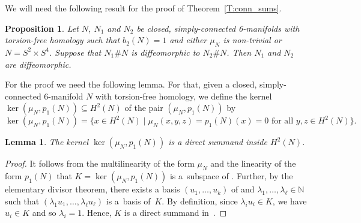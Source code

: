 \documentclass[10pt,a4paper]{amsart}
\numberwithin{equation}{section}
\newtheorem{Lemma}[Theorem]{Lemma}
\newtheorem{Proposition}[Theorem]{Proposition}
\theoremstyle{definition}
\numberwithin{table}{section}
\newcommand{\N}{\mathbb{N}}
\begin{document}
We will need the following result for the proof of Theorem~\ref{T:conn_sums}.
\begin{Proposition}\label{P:splitting_diffeo}
	Let $N$, $N_1$ and $N_2$ be closed, simply-connected 6-manifolds with torsion-free homology such that $b_2(N)=1$ and either $\mu_N$ is non-trivial or $N=S^2\times S^4$. Suppose that $N_1\# N$ is diffeomorphic to $N_2\# N$. Then $N_1$ and $N_2$ are diffeomorphic.
\end{Proposition}
For the proof we need the following lemma. For that, given a closed, simply-connected 6-manifold $N$ with torsion-free homology, we define the kernel $\ker(\mu_N,p_1(N))\subseteq H^2(N)$ of the pair $(\mu_N,p_1(N))$ by
\[ \ker(\mu_N,p_1(N))=\bigl\{ x\in H^2(N)\mid \mu_{N}(x,y,z)=p_1(N)(x)=0\text{ for all }y,z\in H^2(N)\bigr\}. \]
\begin{Lemma}\label{L:ker_dir_sum}
	The kernel $\ker(\mu_N,p_1(N))$ is a direct summand inside $H^2(N)$.
\end{Lemma}
\begin{proof}
	It follows from the multilinearity of the form $\mu_N$ and the linearity of the form $p_1(N)$ that $K=\ker(\mu_N,p_1(N))$ is a~subspace of . Further, by the elementary divisor theorem, there exists a basis $(u_1,\dots,u_k)$ of  and $\lambda_1,\dots,\lambda_\ell\in \N$ such that $(\lambda_1 u_1,\dots,\lambda_\ell u_\ell)$ is a~basis of~$K$. By definition, since $\lambda_i u_i\in K$, we have $u_i\in K$ and so $\lambda_i=1$. Hence, $K$ is a direct summand in~.
\end{proof}
\end{document}
